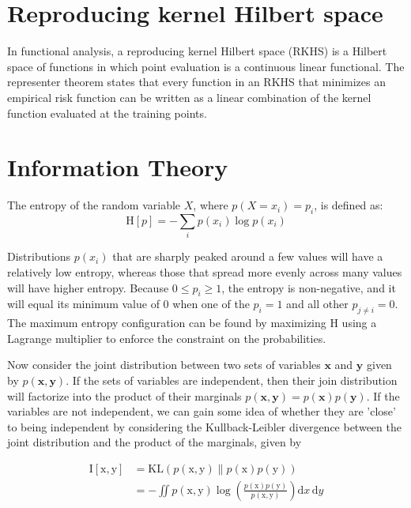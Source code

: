 \documentclass{article}
\begin{document}
\section{Reproducing kernel Hilbert space}
In functional analysis, a reproducing kernel Hilbert space (RKHS) is a
Hilbert space of functions in which point evaluation is a continuous
linear functional. The representer theorem states that every function
in an RKHS that minimizes an empirical risk function can be written as
a linear combination of the kernel function evaluated at the training
points.

\section{Information Theory}
The entropy of the random variable $X$, where $p(X = x_i) = p_i$, is
defined as:
\begin{equation} \label{eq:entropy}
  \mathrm{H}[p] = -\sum_{i}p(x_i)\log p(x_i)
\end{equation}

Distributions $p(x_i)$ that are sharply peaked around a few values
will have a relatively low entropy, whereas those that spread more
evenly across many values will have higher entropy. Because $0 \leq
p_i \geq 1$, the entropy is non-negative, and it will equal its
minimum value of 0 when one of the $p_i = 1$ and all other $p_{j \neq
  i} = 0$. The maximum entropy configuration can be found by
maximizing $\mathrm{H}$ using a Lagrange multiplier to enforce the
constraint on the probabilities.

Now consider the joint distribution between two sets of variables
$\mathbf{x}$ and $\mathbf{y}$ given by $p(\mathbf{x}, \mathbf{y})$. If
the sets of variables are independent, then their join distribution
will factorize into the product of their marginals $p(\mathbf{x},
\mathbf{y}) = p(\mathbf{x})p(\mathbf{y})$. If the variables are not
independent, we can gain some idea of whether they are 'close' to
being independent by considering the Kullback-Leibler divergence
between the joint distribution and the product of the marginals, given
by

\begin{align}
    \mathrm{I}[\mathrm{x}, \mathrm{y}] &=
                                         \mathrm{KL}(p(\mathrm{x},\mathrm{y}) \parallel
                                         p(\mathrm{x})p(\mathrm{y}))
                                         \nonumber \\
& = - \iint p(\mathrm{x},\mathrm{y}) \log \left (
  \frac{p(\mathrm{x})p(\mathrm{y})}{p(\mathrm{x}, \mathrm{y})} \right
  ) \mathrm{d} x \, \mathrm{d} y \label{eq:mutual-info}
\end{align}
\end{document}
